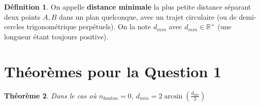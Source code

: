 \documentclass{amsart}
\newtheorem{theorem}{Théorème}[section]
\theoremstyle{definition}
\newtheorem{definition}[theorem]{Définition}
\theoremstyle{remark}
\numberwithin{equation}{section}
\begin{document}
\begin{definition}
  On appelle \textbf{distance minimale} la plus petite distance séparant deux points $A,B$ dans un plan quelconque, avec un trajet circulaire (ou de demi-cercles trigonométrique perpétuels). On la note $d_{min}$ avec $d_{min}\in\mathbb{R^+}$ (une longueur étant toujours positive).
\end{definition}

\newpage








\section{Théorèmes pour la Question 1}

\begin{theorem}
  Dans le cas où $n_{bouton}=0$, $d_{min}= 2\arcsin (\frac{d_{abs}}{2})$
\end{theorem}
\end{document}
